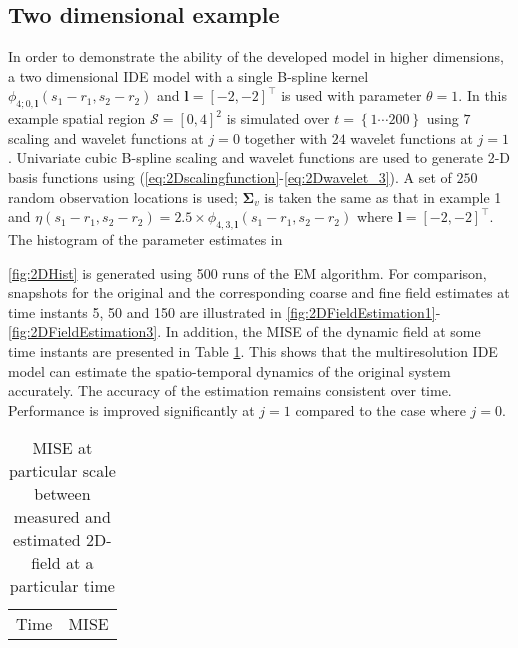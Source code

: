 \documentclass[draftcls,onecolumn]{IEEEtran}
\begin{document}
{{\subsection{Two dimensional example}
In order to demonstrate the ability of the developed model in higher dimensions, a two dimensional IDE model with a single B-spline kernel $\phi_{4;0,\mathbf{l}}\left(s_1-r_1,s_2-r_2\right) $ and $\mathbf l=[-2,-2]^ \top$ is used with parameter $\theta=1$. In this example spatial region $\mathcal{S}=[0,4]^2 $ is simulated over $t=\left\lbrace1 \cdots 200  \right\rbrace $ using $7$ scaling and wavelet functions at $j=0$ together with $24$ wavelet functions at $j=1$. Univariate cubic B-spline scaling and wavelet functions are used to generate 2-D basis functions using (\ref{eq:2Dscalingfunction}-\ref{eq:2Dwavelet_3}). A set of $250$ random  observation locations is used; $\mathbf{\Sigma}_v$ is taken the same as that in example 1 and $ \eta\left(s_1-r_1,s_2-r_2\right) =2.5\times\phi_{4,3,\mathbf{l}}\left(s_1-r_1,s_2-r_2\right)$ where $\mathbf l=[-2,-2]^ \top$. The histogram of the parameter estimates  in \figurename{\ref{fig:2DHist} is generated using 500 runs of the EM algorithm. For comparison, snapshots for the original and the corresponding coarse and fine field estimates at time instants 5, 50 and 150 are illustrated in \figurename{\ref{fig:2DFieldEstimation1}-\ref{fig:2DFieldEstimation3}}. In addition, the MISE of the dynamic field at some time instants are presented in Table \ref{table:ValidationResultField}.  This shows that the multiresolution IDE model can estimate the spatio-temporal dynamics of the original system accurately. The accuracy of the estimation remains consistent over time. Performance is improved significantly at $j=1$ compared to the case where $j=0$.
\begin{table}[!h]
\renewcommand{\arraystretch}{1.3}
\caption {MISE  at particular scale between measured and estimated 2D-field  at a particular time}
\label{table:ValidationResultField}
\centering
\begin{tabular}{cccc}
\hline \hline
\multicolumn{2}{r}{Time}&\multicolumn{2}{c}{MISE} \\
\cline{3-4}

\end{tabular}
\end{table}}}}
\end{document}
